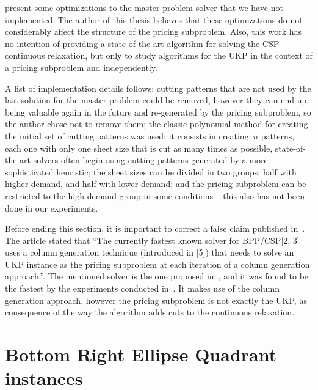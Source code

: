 \cite{gg-61,gg-63,gg-66} present some optimizations to the master problem solver that we have not implemented.
The author of this thesis believes that these optimizations do not considerably affect the structure of the pricing subproblem.
Also, this work has no intention of providing a state-of-the-art algorithm for solving the CSP continuous relaxation, but only to study algorithms for the UKP in the context of a pricing subproblem and independently.

A list of implementation details follows: cutting patterns that are not used by the last solution for the master problem could be removed, however they can end up being valuable again in the future and re-generated by the pricing subproblem, so the author chose not to remove them; the classic polynomial method for creating the initial set of cutting patterns was used: it consists in creating~\(n\) patterns, each one with only one sheet size that is cut as many times as possible, state-of-the-art solvers often begin using cutting patterns generated by a more sophisticated heuristic; the sheet sizes can be divided in two groups, half with higher demand, and half with lower demand; and the pricing subproblem can be restricted to the high demand group in some conditions -- this also has not been done in our experiments.

Before ending this section, it is important to correct a false claim published in~\cite{sea2016}.
The article stated that ``The currently fastest known solver for BPP/CSP[2, 3] uses a column generation technique (introduced in [5]) that needs to solve an UKP instance as the pricing subproblem at each iteration of a column generation approach.''.
The mentioned solver is the one proposed in~\cite{belov}, and it was found to be the fastest by the experiments conducted in~\cite{survey2014}.
It makes use of the column generation approach, however the pricing subproblem is not exactly the UKP, as consequence of the way the algorithm adds cuts to the continuous relaxation.

\section{Bottom Right Ellipse Quadrant instances}
\label{sec:breq_inst}


